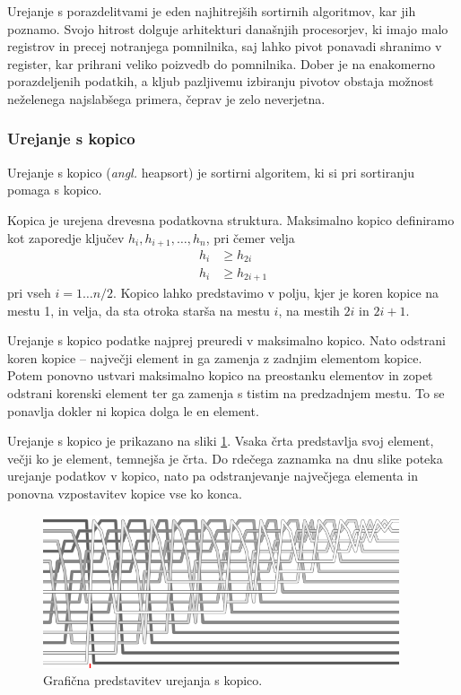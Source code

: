 \documentclass[a4paper,oneside]{article}
\begin{document}
Urejanje s porazdelitvami je eden najhitrejših sortirnih algoritmov, kar jih
poznamo. Svojo hitrost dolguje arhitekturi današnjih procesorjev, ki imajo
malo registrov in precej notranjega pomnilnika, saj lahko pivot ponavadi shranimo v
register, kar prihrani veliko poizvedb do pomnilnika. Dober je na enakomerno
porazdeljenih podatkih, a kljub pazljivemu izbiranju pivotov obstaja možnost neželenega
najslabšega primera, čeprav je zelo neverjetna. 

\subsubsection{Urejanje s kopico}
\label{chapter:heapsort}
Urejanje s kopico (\emph{angl.} heapsort) je sortirni algoritem,
ki si pri sortiranju pomaga s kopico.
\newline

Kopica je urejena drevesna podatkovna struktura.
Maksimalno kopico definiramo kot zaporedje ključev $h_i, h_{i+1}, \ldots, h_n$, pri čemer
velja
\begin{align*}
  h_i &\geq h_{2i} \\
  h_i &\geq h_{2i+1}
\end{align*}
pri vseh $i = 1 \ldots n/2$. %
Kopico lahko predstavimo v polju, kjer je koren kopice na mestu 1, in velja, da sta otroka
starša na mestu $i$, na mestih $2i$ in $2i + 1$.

Urejanje s kopico podatke najprej preuredi v maksimalno kopico. Nato odstrani koren kopice
-- največji element in ga zamenja z zadnjim elementom kopice. Potem ponovno ustvari
maksimalno kopico na preostanku elementov in zopet odstrani korenski element ter ga
zamenja s tistim na predzadnjem mestu. To se ponavlja dokler ni kopica dolga le en
element. 

Urejanje s kopico je prikazano na sliki \ref{fig:heapsortimage}.
Vsaka črta predstavlja svoj element, večji ko je element, temnejša je črta.
Do rdečega zaznamka na dnu slike poteka urejanje podatkov v kopico, nato pa odstranjevanje
največjega elementa in ponovna vzpostavitev kopice vse ko konca.
\begin{figure}[h]
    \begin{center}
        \includegraphics[height=45mm]{slike/Heap.png}
    \end{center}
    \vspace{-0.7cm}
    \caption{Grafična predstavitev urejanja s kopico.}
    \label{fig:heapsortimage}
\end{figure}
\end{document}
